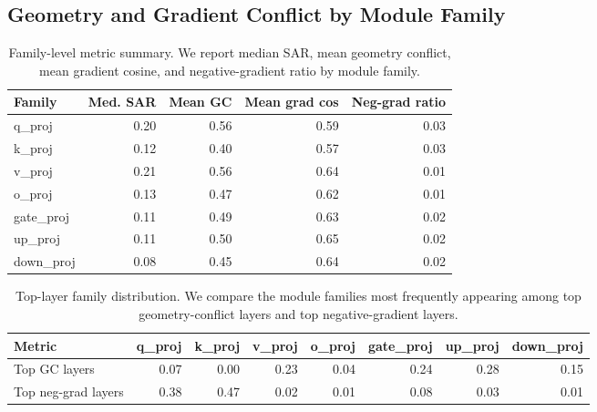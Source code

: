 \documentclass{article}
\begin{document}

\FloatBarrier
\subsection{Geometry and Gradient Conflict by Module Family}
\label{app:family_mechanism}

\begin{table}[!htbp]
  \centering
  \caption{
  {Family-level metric summary.}
  We report median SAR, mean geometry conflict, mean gradient cosine, and negative-gradient ratio by module family.
  }
  \label{tab:app_family_metric_summary}
  \scriptsize
  \setlength{\tabcolsep}{3pt}
{
\renewcommand{\arraystretch}{1.08}
\begin{tabular}{lrrrr}
\toprule[0.9pt]
\rowcolor{sizeBand}
Family & Med. SAR & Mean GC & Mean grad cos & Neg-grad ratio \\
\midrule
\rowcolor{mergeBlue} q\_proj & 0.20 & 0.56 & 0.59 & 0.03 \\
\rowcolor{mergeBlue} k\_proj & 0.12 & 0.40 & 0.57 & 0.03 \\
\rowcolor{mergeBlue} v\_proj & 0.21 & 0.56 & 0.64 & 0.01 \\
\rowcolor{mergeBlue} o\_proj & 0.13 & 0.47 & 0.62 & 0.01 \\
\midrule
\rowcolor{rcwmBlue} gate\_proj & 0.11 & 0.49 & 0.63 & 0.02 \\
\rowcolor{rcwmBlue} up\_proj & 0.11 & 0.50 & 0.65 & 0.02 \\
\rowcolor{rcwmBlue} down\_proj & 0.08 & 0.45 & 0.64 & 0.02 \\
\bottomrule[0.9pt]
\end{tabular}
}

\end{table}

\begin{table}[!htbp]
  \centering
  \caption{
  {Top-layer family distribution.}
  We compare the module families most frequently appearing among top geometry-conflict layers and top negative-gradient layers.
  }
  \label{tab:app_top_layer_family_distribution}
  \scriptsize
  \setlength{\tabcolsep}{3pt}
{
\renewcommand{\arraystretch}{1.08}
\begin{tabular}{lrrrrrrr}
\toprule[0.9pt]
\rowcolor{sizeBand}
Metric & q\_proj & k\_proj & v\_proj & o\_proj & gate\_proj & up\_proj & down\_proj \\
\midrule
\rowcolor{rcwmBlue} Top GC layers & 0.07 & 0.00 & 0.23 & 0.04 & 0.24 & 0.28 & 0.15 \\
\rowcolor{mergeBlue} Top neg-grad layers & 0.38 & 0.47 & 0.02 & 0.01 & 0.08 & 0.03 & 0.01 \\
\bottomrule[0.9pt]
\end{tabular}
}

\end{table}
\end{document}
